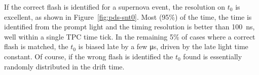 If the correct flash is identified for a supernova event, the
resolution on $t_0$ is excellent, as shown in
Figure~\ref{fig:pds-snt0}.
Most (95\%) of the time, the time is identified from the prompt light
and the timing resolution is better than \SI{100}{ns}, well within a
single TPC time tick.
In the remaining 5\% of cases where a correct flash is matched, the
$t_0$ is biased late by a few \si{\micro\second}, driven by the late
light time constant.
Of course, if the wrong flash is identified the $t_0$ found is
essentially randomly distributed in the drift time.



